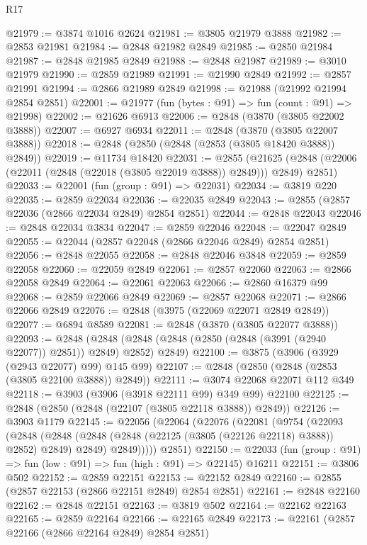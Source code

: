 \begin{lexlean}{R17}
\begin{coremodule}
@21979 := @3874 @1016 @2624
@21981 := @3805 @21979 @3888
@21982 := @2853 @21981
@21984 := @2848 @21982 @2849
@21985 := @2850 @21984
@21987 := @2848 @21985 @2849
@21988 := @2848 @21987
@21989 := @3010 @21979
@21990 := @2859 @21989
@21991 := @21990 @2849
@21992 := @2857 @21991
@21994 := @2866 @21989 @2849
@21998 := @21988 (@21992 @21994 @2854 @2851)
@22001 := @21977 (fun (bytes : @91) => fun (count : @91) => @21998)
@22002 := @21626 @6913
@22006 := @2848 (@3870 (@3805 @22002 @3888))
@22007 := @6927 @6934
@22011 := @2848 (@3870 (@3805 @22007 @3888))
@22018 := @2848 (@2850 (@2848 (@2853 (@3805 @18420 @3888)) @2849))
@22019 := @11734 @18420
@22031 := @2855
    (@21625 (@2848 (@22006 (@22011 (@2848 (@22018 (@3805 @22019 @3888)) @2849))) @2849) @2851)
@22033 := @22001 (fun (group : @91) => @22031)
@22034 := @3819 @220
@22035 := @2859 @22034
@22036 := @22035 @2849
@22043 := @2855 (@2857 @22036 (@2866 @22034 @2849) @2854 @2851)
@22044 := @2848 @22043
@22046 := @2848 @22034 @3834
@22047 := @2859 @22046
@22048 := @22047 @2849
@22055 := @22044 (@2857 @22048 (@2866 @22046 @2849) @2854 @2851)
@22056 := @2848 @22055
@22058 := @2848 @22046 @3848
@22059 := @2859 @22058
@22060 := @22059 @2849
@22061 := @2857 @22060
@22063 := @2866 @22058 @2849
@22064 := @22061 @22063
@22066 := @2860 @16379 @99
@22068 := @2859 @22066 @2849
@22069 := @2857 @22068
@22071 := @2866 @22066 @2849
@22076 := @2848 (@3975 (@22069 @22071 @2849 @2849))
@22077 := @6894 @8589
@22081 := @2848 (@3870 (@3805 @22077 @3888))
@22093 := @2848
    (@2848 (@2848 (@2848 (@2850 (@2848 (@3991 (@2940 @22077)) @2851)) @2849) @2852) @2849)
@22100 := @3875 (@3906 (@3929 (@2943 @22077) @99) @145 @99)
@22107 := @2848 (@2850 (@2848 (@2853 (@3805 @22100 @3888)) @2849))
@22111 := @3074 @22068 @22071 @112 @349
@22118 := @3903 (@3906 (@3918 @22111 @99) @349 @99) @22100
@22125 := @2848 (@2850 (@2848 (@22107 (@3805 @22118 @3888)) @2849))
@22126 := @3903 @1179
@22145 := @22056
    (@22064
      (@22076
        (@22081
          (@9754
            (@22093
              (@2848
                (@2848 (@2848 (@2848 (@22125 (@3805 (@22126 @22118) @3888)) @2852) @2849) @2849)
                @2849)))))
      @2851)
@22150 := @22033 (fun (group : @91) => fun (low : @91) => fun (high : @91) => @22145) @16211
@22151 := @3806 @502
@22152 := @2859 @22151
@22153 := @22152 @2849
@22160 := @2855 (@2857 @22153 (@2866 @22151 @2849) @2854 @2851)
@22161 := @2848 @22160
@22162 := @2848 @22151
@22163 := @3819 @502
@22164 := @22162 @22163
@22165 := @2859 @22164
@22166 := @22165 @2849
@22173 := @22161 (@2857 @22166 (@2866 @22164 @2849) @2854 @2851)

\end{coremodule}
\end{lexlean}
